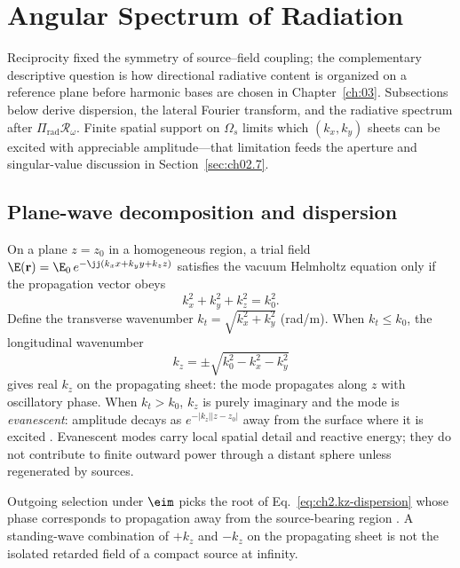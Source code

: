 
\section{Angular Spectrum of Radiation}
\label{sec:ch02.10}

Reciprocity fixed the symmetry of source--field coupling; the complementary descriptive question is how directional radiative content is organized on a reference plane before harmonic bases are chosen in Chapter~\ref{ch:03}. Subsections below derive dispersion, the lateral Fourier transform, and the radiative spectrum after $\Pi_{\mathrm{rad}}\mathcal{R}_\omega$. Finite spatial support on $\Omega_s$ limits which $(k_x,k_y)$ sheets can be excited with appreciable amplitude---that limitation feeds the aperture and singular-value discussion in Section~\ref{sec:ch02.7}.

\subsection{Plane-wave decomposition and dispersion}
\label{sec:ch02.10.1}

On a plane $z=z_0$ in a homogeneous region, a trial field $\E(\mathbf{r})=\E_0\,e^{-\jj(k_x x+k_y y+k_z z)}$ satisfies the vacuum Helmholtz equation only if the propagation vector obeys
\begin{equation}
\label{eq:ch2.dispersion-relation}
k_x^2+k_y^2+k_z^2=k_0^2.
\end{equation}
Define the transverse wavenumber $k_t=\sqrt{k_x^2+k_y^2}$ (rad/m). When $k_t\le k_0$, the longitudinal wavenumber
\begin{equation}
\label{eq:ch2.kz-dispersion}
k_z=\pm\sqrt{k_0^2-k_x^2-k_y^2}
\end{equation}
gives real $k_z$ on the propagating sheet: the mode propagates along $z$ with oscillatory phase. When $k_t>k_0$, $k_z$ is purely imaginary and the mode is \emph{evanescent}: amplitude decays as $e^{-|k_z||z-z_0|}$ away from the surface where it is excited \cite{stratton1941,harrington2001}. Evanescent modes carry local spatial detail and reactive energy; they do not contribute to finite outward power through a distant sphere unless regenerated by sources.

Outgoing selection under $\eim$ picks the root of Eq.~\eqref{eq:ch2.kz-dispersion} whose phase corresponds to propagation away from the source-bearing region \cite{stratton1941}. A standing-wave combination of $+k_z$ and $-k_z$ on the propagating sheet is not the isolated retarded field of a compact source at infinity.

